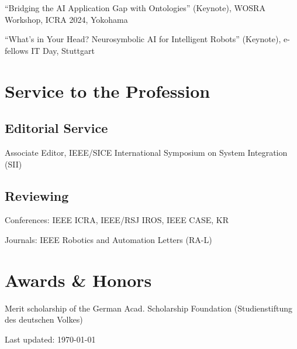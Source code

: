 \documentclass[11pt]{article} %
\begin{document}
``Bridging the AI Application Gap with Ontologies'' (Keynote), WOSRA Workshop, ICRA 2024, Yokohama

``What's in Your Head? Neurosymbolic AI for Intelligent Robots'' (Keynote), e-fellows IT Day, Stuttgart


\section*{Service to the Profession}

\subsection*{Editorial Service}

Associate Editor, IEEE/SICE International Symposium on System Integration (SII)

\subsection*{Reviewing}

Conferences: IEEE ICRA, IEEE/RSJ IROS, IEEE CASE, KR

Journals: IEEE Robotics and Automation Letters (RA-L)


\section*{Awards \& Honors}

Merit scholarship of the German Acad. Scholarship Foundation (Studienstiftung des deutschen Volkes)\\


\vfill

\begin{center}
	\scriptsize
	Last updated: \today
\end{center}

\end{document}
